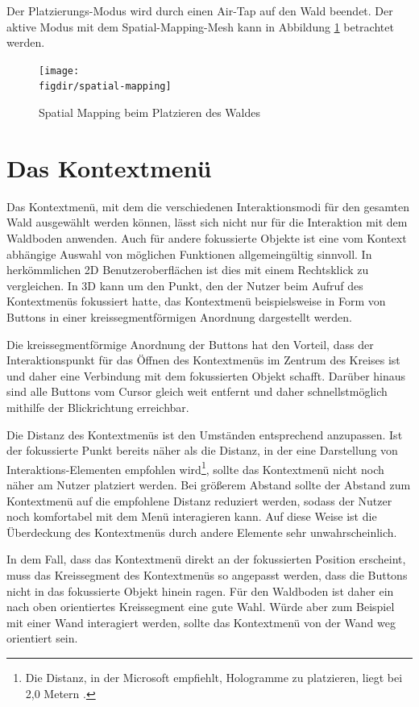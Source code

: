 Der Platzierungs-Modus wird durch einen Air-Tap auf den Wald beendet. Der aktive Modus mit dem Spatial-Mapping-Mesh kann in Abbildung \ref{fig:spatial-mapping} betrachtet werden.

\begin{figure}[htb]
  \texttt{[image: \\figdir/spatial-mapping]}
  \caption{Spatial Mapping beim Platzieren des Waldes}
  \label{fig:spatial-mapping}
\end{figure}

\section{Das Kontextmenü}
Das Kontextmenü, mit dem die verschiedenen Interaktionsmodi für den gesamten Wald ausgewählt werden können, lässt sich nicht nur für die Interaktion mit dem Waldboden anwenden. Auch für andere fokussierte Objekte ist eine vom Kontext abhängige Auswahl von möglichen Funktionen allgemeingültig sinnvoll. In herkömmlichen 2D Benutzeroberflächen ist dies mit einem Rechtsklick zu vergleichen. In 3D kann um den Punkt, den der Nutzer beim Aufruf des Kontextmenüs fokussiert hatte, das Kontextmenü beispielsweise in Form von Buttons in einer kreissegmentförmigen Anordnung dargestellt werden.

Die kreissegmentförmige Anordnung der Buttons hat den Vorteil, dass der Interaktionspunkt für das Öffnen des Kontextmenüs im Zentrum des Kreises ist und daher eine Verbindung mit dem fokussierten Objekt schafft. Darüber hinaus sind alle Buttons vom Cursor gleich weit entfernt und daher schnellstmöglich mithilfe der Blickrichtung erreichbar.

Die Distanz des Kontextmenüs ist den Umständen entsprechend anzupassen. Ist der fokussierte Punkt bereits näher als die Distanz, in der eine Darstellung von Interaktions-Elementen empfohlen wird\footnote{Die Distanz, in der Microsoft empfiehlt, Hologramme zu platzieren, liegt bei 2,0 Metern \cite{windows2017interaction}.}, sollte das Kontextmenü nicht noch näher am Nutzer platziert werden. Bei größerem Abstand sollte der Abstand zum Kontextmenü auf die empfohlene Distanz reduziert werden, sodass der Nutzer noch komfortabel mit dem Menü interagieren kann. Auf diese Weise ist die Überdeckung des Kontextmenüs durch andere Elemente sehr unwahrscheinlich.

In dem Fall, dass das Kontextmenü direkt an der fokussierten Position erscheint, muss das Kreissegment des Kontextmenüs so angepasst werden, dass die Buttons nicht in das fokussierte Objekt hinein ragen. Für den Waldboden ist daher ein nach oben orientiertes Kreissegment eine gute Wahl. Würde aber zum Beispiel mit einer Wand interagiert werden, sollte das Kontextmenü von der Wand weg orientiert sein.

